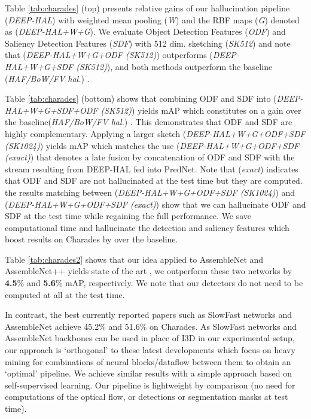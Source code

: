 \vspace{0.05cm}
 Table \ref{tab:charades} (top) presents relative gains of our hallucination pipeline ({\em DEEP-HAL}) with weighted mean pooling ({\em W}) and the RBF maps ({\em G}) denoted as ({\em DEEP-HAL+W+G}). We evaluate Object Detection Features ({\em ODF}) and Saliency Detection Features ({\em SDF}) with 512 dim. sketching ({\em SK512})  and note that ({\em DEEP-HAL+W+G+ODF (SK512)}) outperforms ({\em DEEP-HAL+W+G+SDF (SK512)}), and both methods outperform the baseline ({\em HAF/BoW/FV hal.}) \cite{Wang_2019_ICCV}. 

Table \ref{tab:charades} (bottom) shows that combining ODF and SDF into ({\em DEEP-HAL+W+G+SDF+ODF (SK512)}) yields  mAP which constitutes on a  gain over the baseline({\em HAF/BoW/FV hal.}) \cite{Wang_2019_ICCV}. This demonstrates that ODF and SDF are highly complementary. Applying a larger sketch ({\em DEEP-HAL+W+G+ODF+SDF (SK1024)}) yields  mAP which matches the use  ({\em DEEP-HAL+W+G+ODF+SDF (exact)}) that denotes a late fusion by concatenation of ODF and SDF with the stream resulting from DEEP-HAL fed into PredNet. Note that ({\em exact}) indicates that ODF and SDF are not hallucinated at the test time but they are computed. the results matching between ({\em DEEP-HAL+W+G+ODF+SDF (SK1024)}) and  ({\em DEEP-HAL+W+G+ODF+SDF (exact)}) show that we can hallucinate ODF and SDF at the test time while regaining the full performance. We save computational time and hallucinate the detection and saliency features which boost results on Charades by  over the baseline. 

Table \ref{tab:charades2} shows that our idea applied to AssembleNet and AssembleNet++ yields state of the art \eg, we outperform these two networks by \textbf{4.5}\% and \textbf{5.6}\% mAP, respectively. We note that our detectors do not need to be computed at all at the test time. 

In contrast, the best currently reported papers such as SlowFast networks \cite{slowfast} and AssembleNet \cite{assemblenet} achieve 45.2\% and 51.6\% on Charades. 
As SlowFast networks and AssembleNet backbones can be used in place of I3D in our experimental setup,  our approach is `orthogonal' to these latest developments  which focus on heavy mining for combinations of neural blocks/dataflow between them to obtain an `optimal' pipeline. 
We achieve similar results with a simple approach based on self-supervised learning. Our pipeline is lightweight by comparison (no need for computations of the optical flow, or detections or segmentation masks at test time).

